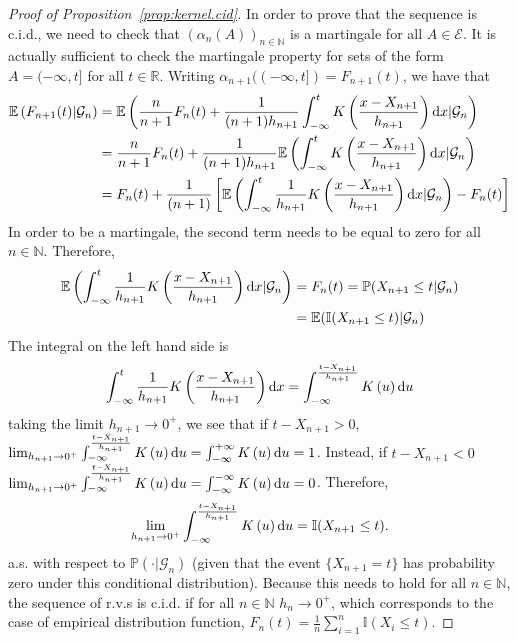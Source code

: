 \documentclass{article}
\theoremstyle{definition}
\newcommand{\di}{{\rm d}}
\renewcommand{\&}{and}
\begin{document}
\begin{proof}[Proof of Proposition~\ref{prop:kernel.cid}]
	In order to prove that the sequence is c.i.d., we need to check that $(\alpha_{n}(A))_{n\in \mathbb{N}}$ is a martingale for all $A \in \mathcal{E}$. It is actually sufficient to check the martingale property for sets of the form $A= (-\infty,t]$ for all $t \in \mathbb{R}$. Writing $ \alpha_{n+1}((-\infty,t])=F_{n+1}(t)$, we have that
	\begin{align}\label{eq:kernel_acid}
 \mathbb{E}\left( F_{n+1}(t) |\mathcal{G}_{n}\right) 
		&=  \mathbb{E}\left( \frac{n}{n+1}F_{n}(t)+\frac{1}{(n+1) h_{n+1}} \int_{-\infty}^{t} K\left(\frac{x-X_{n+1}}{h_{n+1}}\right) \di x |\mathcal{G}_{n}\right) \nonumber \\
		& =   \frac{n}{n+1}F_{n}(t)+\frac{1}{(n+1) h_{n+1}} \mathbb{E}\left(\int_{-\infty}^{t} K\left(\frac{x-X_{n+1}}{h_{n+1}}\right) \di x |\mathcal{G}_{n}\right)\nonumber \\
		&=  F_{n}(t)+\frac{1}{(n+1)}  \left[ \mathbb{E}\left(\int_{-\infty}^{t} \frac{1}{h_{n+1}} K\left(\frac{x-X_{n+1}}{h_{n+1}}\right)  \di x |\mathcal{G}_{n}\right) -F_{n}(t)\right] \nonumber
	\end{align}
	In order to be a martingale, the second term needs to be equal to zero for all $n\in \mathbb{N}$. Therefore,
	\begin{align*}
	\mathbb{E}\left(\int_{-\infty}^{t} 	\frac{1}{h_{n+1}}  K\left(\frac{x-X_{n+1}}{h_{n+1}}\right) \di x |\mathcal{G}_{n}\right)  &= F_{n}(t)= \mathbb{P}(X_{n+1}\leq t|\mathcal{G}_{n}) \\
    &=\mathbb{E}(\mathbb{I}(X_{n+1}\leq t)|\mathcal{G}_{n}) 
	\end{align*}
	The integral on the left hand side is
	\begin{equation*}
	\int_{-\infty}^{t} 	\frac{1}{h_{n+1}} K\left(\frac{x-X_{n+1}}{h_{n+1}}\right) \di x = \int_{-\infty}^{\frac{t-X_{n+1}}{h_{n+1}}} K\left(u \right) \di u
	\end{equation*}
	taking the limit $h_{n+1} \to 0^{+}$, we see that if $t-X_{n+1}>0$, $\lim_{h_{n+1}\to 0^{+}} \int_{-\infty}^{\frac{t-X_{n+1}}{h_{n+1}}} K\left(u \right) \di u = \int_{-\infty}^{+\infty} K\left(u \right) \di u =1$. Instead, if $t-X_{n+1}<0$ $\lim_{h_{n+1}\to 0^{+}} \int_{-\infty}^{\frac{t-X_{n+1}}{h_{n+1}}} K\left(u \right) \di u = \int_{-\infty}^{-\infty} K\left(u \right) \di u =0$. Therefore, 
	\begin{equation*}
		\lim_{h_{n+1}\to 0^{+}} \int_{-\infty}^{\frac{t-X_{n+1}}{h_{n+1}}} K\left(u \right) \di u = \mathbb{I}(X_{n+1}\leq t).
	\end{equation*}
	a.s. with respect to $\mathbb{P}(\cdot|\mathcal{G}_{n})$ (given that the event $\{X_{n+1} = t\}$ has probability zero under this conditional distribution). Because this needs to hold for all $n\in \mathbb{N}$, the sequence of r.v.s is c.i.d. if for all $n\in\mathbb{N}$ $h_{n}\to0^+$, which corresponds to the case of empirical distribution function, $F_{n}(t)= \frac{1}{n}\sum_{i=1}^{n} \mathbb{I}(X_{i}\leq t)$.


\end{proof}
\end{document}
